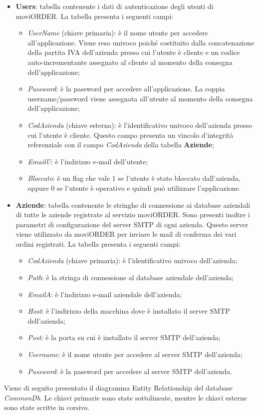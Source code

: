 \begin{itemize}
	\item \textbf{Users}: tabella contenente i dati di autenticazione degli utenti di moviORDER. La tabella presenta i seguenti campi:
		\begin{itemize}
			\item \textit{UserName} (chiave primaria): è il nome utente per accedere all'applicazione. Viene reso univoco poiché costituito dalla concatenazione della partita IVA dell'azienda presso cui l'utente è cliente e un codice auto-incrementante assegnato al cliente al momento della consegna dell'applicazione;
			\item \textit{Password}: è la password per accedere all'applicazione. La coppia username/password viene assegnata all'utente al momento della consegna dell'applicazione;
			\item \textit{CodAzienda} (chiave esterna): è l'identificativo univoco dell'azienda presso cui l'utente è cliente. Questo campo presenta un vincolo d'integrità referenziale con il campo \textit{CodAzienda} della tabella \textbf{Aziende};
			\item \textit{EmailU}: è l'indirizzo e-mail dell'utente;
			\item \textit{Bloccato}: è un flag che vale 1 se l'utente è stato bloccato dall'azienda, oppure 0 se l'utente è operativo e quindi può utilizzare l'applicazione.
		\end{itemize}
	\item \textbf{Aziende}: tabella contenente le stringhe di connessione ai database aziendali di tutte le aziende registrate al servizio moviORDER. Sono presenti inoltre i parametri di configurazione del server SMTP di ogni azienda. Questo server viene utilizzato da moviORDER per inviare le mail di conferma dei vari ordini registrati. La tabella presenta i seguenti campi:
	\begin{itemize}
		\item \textit{CodAzienda} (chiave primaria): è l'identificativo univoco dell'azienda;
		\item \textit{Path}: è la stringa di connessione al database aziendale dell'azienda;
		\item \textit{EmailA}: è l'indirizzo e-mail aziendale dell'azienda;
		\item \textit{Host}: è l'indirizzo della macchina dove è installato il server SMTP dell'azienda;
		\item \textit{Post}: è la porta su cui è installato il server SMTP dell'azienda;
		\item \textit{Username}: è il nome utente per accedere al server SMTP dell'azienda;
		\item \textit{Password}: è la password per accedere al server SMTP dell'azienda.
	\end{itemize}
\end{itemize}
Viene di seguito presentato il diagramma Entity Relationship del database \textit{CommonDb}. Le chiavi primarie sono state sottolineate, mentre le chiavi esterne sono state scritte in corsivo.

